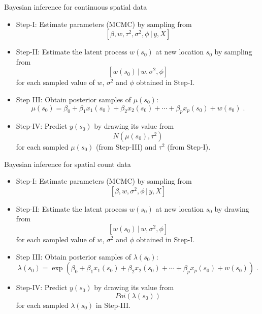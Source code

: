 \documentclass[xcolor=pdftex,dvipsnames,table,numbers,hyperref={pdfpagelabels=false},compress]{beamer}
\newcommand{\given}{\,|\,}
\begin{document}
\begin{frame}{Bayesian inference for continuous spatial data}
 
 \begin{itemize}
  \item Step-I: Estimate parameters (MCMC) by sampling from
  \[
   [\beta, w, \tau^2, \sigma^2, \phi \given y, X]
  \]

  \item Step-II: Estimate the latent process $w(s_0)$ at new location $s_0$ by sampling from
  \[
   [w(s_0) \given w, \sigma^2, \phi] 
  \]
  for each sampled value of $w$, $\sigma^2$ and $\phi$ obtained in Step-I.
  
  \item Step III: Obtain posterior samples of $\mu(s_0)$:
  \[
   \mu(s_0) = \beta_0 + \beta_1 x_{1}(s_0) + \beta_2 x_{2}(s_0) + \cdots + \beta_p x_{p}(s_0) + w(s_0)\;.
  \]

  \item Step-IV: Predict $y(s_0)$ by drawing its value from
  \[
   N(\mu(s_0),\tau^2)
  \]
  for each sampled $\mu(s_0)$ (from Step-III) and $\tau^2$ (from Step-I).
  
 \end{itemize}
 
\end{frame}

\begin{frame}{Bayesian inference for spatial count data}
 
 \begin{itemize}
  \item Step-I: Estimate parameters (MCMC) by sampling from
  \[
   [\beta, w, \sigma^2, \phi \given y, X]
  \]

  \item Step-II: Estimate the latent process $w(s_0)$ at new location $s_0$ by drawing from
  \[
   [w(s_0) \given w, \sigma^2, \phi] 
  \]
  for each sampled value of $w$, $\sigma^2$ and $\phi$ obtained in Step-I.
  
  \item Step III: Obtain posterior samples of $\lambda(s_0)$:
  {\small
  \[
   \lambda(s_0) = \exp\left(\beta_0 + \beta_1 x_{1}(s_0) + \beta_2 x_{2}(s_0) + \cdots + \beta_p x_{p}(s_0) + w(s_0)\right)\;.
  \]
  }
  \item Step-IV: Predict $y(s_0)$ by drawing its value from
  \[
   Poi(\lambda(s_0))
  \]
  for each sampled $\lambda(s_0)$ in Step-III.
  
 \end{itemize}
 
\end{frame}
\end{document}
